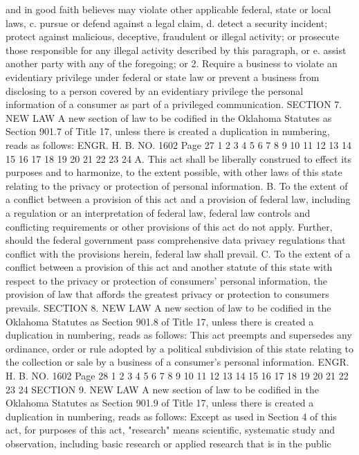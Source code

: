 and in good faith believes may violate other
applicable federal, state or local laws,
c. pursue or defend against a legal claim,
d. detect a security incident; protect against malicious,
deceptive, fraudulent or illegal activity; or
prosecute those responsible for any illegal activity
described by this paragraph, or
e. assist another party with any of the foregoing; or
2. Require a business to violate an evidentiary privilege under
federal or state law or prevent a business from disclosing to a
person covered by an evidentiary privilege the personal information
of a consumer as part of a privileged communication.
SECTION 7. NEW LAW A new section of law to be codified
in the Oklahoma Statutes as Section 901.7 of Title 17, unless there
is created a duplication in numbering, reads as follows:
ENGR. H. B. NO. 1602 Page 27
1
2
3
4
5
6
7
8
9
10
11
12
13
14
15
16
17
18
19
20
21
22
23
24
A. This act shall be liberally construed to effect its purposes
and to harmonize, to the extent possible, with other laws of this
state relating to the privacy or protection of personal information.
B. To the extent of a conflict between a provision of this act
and a provision of federal law, including a regulation or an
interpretation of federal law, federal law controls and conflicting
requirements or other provisions of this act do not apply. Further,
should the federal government pass comprehensive data privacy
regulations that conflict with the provisions herein, federal law
shall prevail.
C. To the extent of a conflict between a provision of this act
and another statute of this state with respect to the privacy or
protection of consumers' personal information, the provision of law
that affords the greatest privacy or protection to consumers
prevails.
SECTION 8. NEW LAW A new section of law to be codified
in the Oklahoma Statutes as Section 901.8 of Title 17, unless there
is created a duplication in numbering, reads as follows:
This act preempts and supersedes any ordinance, order or rule
adopted by a political subdivision of this state relating to the
collection or sale by a business of a consumer's personal
information.
ENGR. H. B. NO. 1602 Page 28
1
2
3
4
5
6
7
8
9
10
11
12
13
14
15
16
17
18
19
20
21
22
23
24
SECTION 9. NEW LAW A new section of law to be codified
in the Oklahoma Statutes as Section 901.9 of Title 17, unless there
is created a duplication in numbering, reads as follows:
Except as used in Section 4 of this act, for purposes of this
act, "research" means scientific, systematic study and observation,
including basic research or applied research that is in the public
